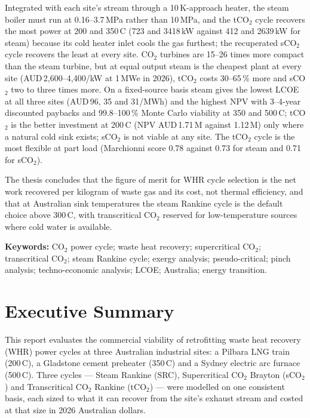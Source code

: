 \documentclass[12pt,a4paper]{report}
\begin{document}
Integrated with each site's stream through a 10\,K-approach heater, the
steam boiler must run at 0.16--3.7\,MPa rather than 10\,MPa, and the tCO$_2$
cycle recovers the most power at 200 and 350\,\textdegree C (723 and
3418\,kW against 412 and 2639\,kW for steam) because its cold heater inlet
cools the gas furthest; the recuperated sCO$_2$ cycle recovers the least at
every site. CO$_2$ turbines are 15--26 times more compact than the steam
turbine, but at equal output steam is the cheapest plant at every site
(AUD\,2{,}600--4{,}400/kW at 1\,MWe in 2026), tCO$_2$ costs 30--65\,\% more
and sCO$_2$ two to three times more. On a fixed-source basis steam gives the
lowest LCOE at all three sites (AUD\,96, 35 and 31/MWh) and the highest NPV
with 3--4-year discounted paybacks and 99.8--100\,\% Monte Carlo viability at
350 and 500\,\textdegree C; tCO$_2$ is the better investment at
200\,\textdegree C (NPV AUD\,1.71\,M against 1.12\,M) only where a natural
cold sink exists; sCO$_2$ is not viable at any site. The tCO$_2$ cycle is
the most flexible at part load (Marchionni score 0.78 against 0.73 for steam
and 0.71 for sCO$_2$).

The thesis concludes that the figure of merit for WHR cycle selection is the
net work recovered per kilogram of waste gas and its cost, not thermal
efficiency, and that at Australian sink temperatures the steam Rankine cycle
is the default choice above 300\,\textdegree C, with transcritical CO$_2$
reserved for low-temperature sources where cold water is available.

\bigskip\noindent\textbf{Keywords:} CO$_2$ power cycle; waste heat recovery;
supercritical CO$_2$; transcritical CO$_2$; steam Rankine cycle; exergy
analysis; pseudo-critical; pinch analysis; techno-economic analysis; LCOE;
Australia; energy transition.

\clearpage

\chapter*{Executive Summary}

This report evaluates the commercial viability of retrofitting waste heat
recovery (WHR) power cycles at three Australian industrial sites: a Pilbara
LNG train (200\,\textdegree C), a Gladstone cement preheater
(350\,\textdegree C) and a Sydney electric arc furnace (500\,\textdegree C).
Three cycles --- Steam Rankine (SRC), Supercritical CO$_2$ Brayton (sCO$_2$)
and Transcritical CO$_2$ Rankine (tCO$_2$) --- were modelled on one
consistent basis, each sized to what it can recover from the site's exhaust
stream and costed at that size in 2026 Australian dollars.
\end{document}
